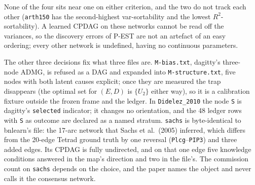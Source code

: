 None of the four sits near one on either criterion, and the two do not track each other
(\texttt{arth150} has the second-highest var-sortability and the lowest $R^2$-sortability). A learned
CPDAG on these networks cannot be read off the variances, so the discovery errors of P-EST
are not an artefact of an easy ordering; every other network is undefined, having no continuous
parameters.

The other three decisions fix what three files are. \texttt{M-bias.txt}, dagitty's three-node ADMG, is
refused as a DAG and expanded into \texttt{M-structure.txt}, five nodes with both latent causes
explicit; once they are measured the trap disappears (the optimal set for $(E, D)$ is $\{U_2\}$ either
way), so it is a calibration fixture outside the frozen frame and the ledger. In
\texttt{Didelez\_2010} the node \texttt{S} is dagitty's \texttt{selected} indicator; it
changes no orientation, and the 48 ledger rows with \texttt{S} as outcome are declared as a named
stratum. \texttt{sachs} is byte-identical to bnlearn's file: the 17-arc network that Sachs et
al.\ (2005) inferred, which differs from the 20-edge Tetrad ground truth by one reversal
(\texttt{Plcg}--\texttt{PIP3}) and three added edges. Its CPDAG is fully undirected, and on that one
edge five knowledge
conditions answered in the map's direction and two in the file's. The commission count on
\texttt{sachs} depends on the choice, and the paper names the object and never calls it the consensus
network.



